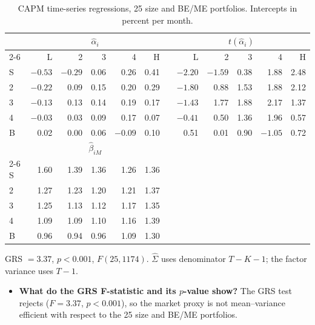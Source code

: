 \begin{table}[H]
\centering
\caption{CAPM time-series regressions, 25 size and BE/ME portfolios.
Intercepts in percent per month.}
\small
\begin{tabular}{lrrrrrcrrrrr}
\toprule
& \multicolumn{5}{c}{$\hat\alpha_i$} && \multicolumn{5}{c}{$t(\hat\alpha_i)$} \\
\cmidrule{2-6}\cmidrule{8-12}
& L & 2 & 3 & 4 & H && L & 2 & 3 & 4 & H \\
\midrule
S & $-0.53$ & $-0.29$ & 0.06 & 0.26 & 0.41 && $-2.20$ & $-1.59$ & 0.38 & 1.88 & 2.48 \\
2 & $-0.22$ & 0.09 & 0.15 & 0.20 & 0.29 && $-1.80$ & 0.88 & 1.53 & 1.88 & 2.12 \\
3 & $-0.13$ & 0.13 & 0.14 & 0.19 & 0.17 && $-1.43$ & 1.77 & 1.88 & 2.17 & 1.37 \\
4 & $-0.03$ & 0.03 & 0.09 & 0.17 & 0.07 && $-0.41$ & 0.50 & 1.36 & 1.96 & 0.57 \\
B & 0.02 & 0.00 & 0.06 & $-0.09$ & 0.10 && 0.51 & 0.01 & 0.90 & $-1.05$ & 0.72 \\
\midrule
& \multicolumn{5}{c}{$\hat\beta_{iM}$} && \multicolumn{5}{c}{} \\
\cmidrule{2-6}
S & 1.60 & 1.39 & 1.36 & 1.26 & 1.36 &&&&&& \\
2 & 1.27 & 1.23 & 1.20 & 1.21 & 1.37 &&&&&& \\
3 & 1.25 & 1.13 & 1.12 & 1.17 & 1.35 &&&&&& \\
4 & 1.09 & 1.09 & 1.10 & 1.16 & 1.39 &&&&&& \\
B & 0.96 & 0.94 & 0.96 & 1.09 & 1.30 &&&&&& \\
\bottomrule
\end{tabular}
\label{tab:p3f_capm}
\vspace{2pt}\begin{minipage}{0.93\textwidth}\footnotesize
GRS $= 3.37$, $p < 0.001$, $F(25, 1174)$. $\hat\Sigma$ uses denominator
$T-K-1$; the factor variance uses $T-1$.
\end{minipage}
\end{table}

\begin{itemize}
\setlength{\itemsep}{4pt}\setlength{\parskip}{0pt}

\item \textbf{What do the GRS F-statistic and its $p$-value show?} The GRS test rejects ($F = 3.37$, $p < 0.001$), so the market proxy is not mean--variance efficient with respect to the 25 size and BE/ME
portfolios.

\end{itemize}

